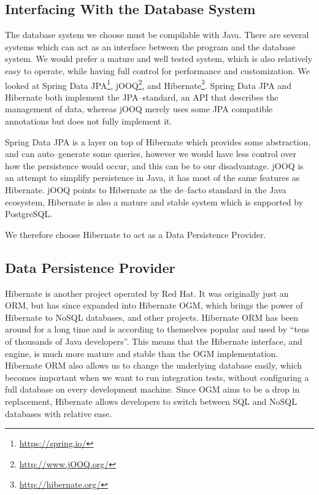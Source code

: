 \subsection{Interfacing With the Database System} %

The database system we choose must be compilable with Java.
There are several systems which can act as an interface between the program and the database system.
We would prefer a mature and well tested system, which is also relatively easy to operate, while having full control for performance and customization.
We looked at Spring Data JPA\footnote{\url{https://spring.io/}}, jOOQ\footnote{\url{http://www.jOOQ.org/}}, and Hibernate\footnote{\url{http://hibernate.org/}}.
Spring Data JPA and Hibernate both implement the \ac{JPA}--standard\cite{JavaPersistenceAPI}, an \ac{API} that describes the management of data, whereas jOOQ merely uses some \ac{JPA} compatible annotations but does not fully implement it. 

Spring Data JPA is a layer on top of Hibernate  which provides some abstraction, and can auto--generate some queries, however we would have less control over how the persistence would occur, and this can be to our disadvantage.
jOOQ is an attempt to simplify persistence in Java, it has most of the same features as Hibernate.
jOOQ points to Hibernate as the de--facto standard in the Java ecosystem\cite{JOOQvsHIBERNATE},
Hibernate is also a mature and stable system which is supported by PostgreSQL. 

We therefore choose Hibernate to act as a Data Persistence Provider.

\subsection{Data Persistence Provider}
Hibernate is another project operated by Red Hat.
It was originally just an \ac{ORM}, but has since expanded into Hibernate \ac{OGM}, which brings the power of Hibernate to NoSQL databases, and other projects.
Hibernate \ac{ORM} has been around for a long time and is according to themselves popular and used by ``tens of thousands of Java developers''.\cite{hibernate_pop}
This means that the Hibernate interface, and engine, is much more mature and stable than the \ac{OGM} implementation.
Hibernate \ac{ORM} also allows us to change the underlying database easily, which becomes important when we want to run integration tests, without configuring a full database on every development machine.
Since \ac{OGM} aims to be a drop in replacement, Hibernate allows developers to switch between SQL and NoSQL databases with relative ease.


